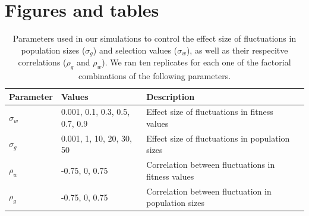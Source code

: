 \documentclass[12pt]{article}
\begin{document}
\section*{Figures and tables }


\begin{table}[h]
\fontsize{10}{18}\selectfont
\centering
\caption{Parameters used in our simulations to control the effect size of fluctuations in population sizes ($\sigma_{g}$) and selection values ($\sigma_{w}$), as well as their respecitve correlations ($\rho_{g}$ and $\rho_{w}$). We ran ten replicates for each one  of the factorial combinations of the following parameters. }
\begin{tabular}{@{}llll@{}}
\toprule
Parameter                    & Values                    & Description                                   &  \\ \midrule
$\sigma_{w}$ & 0.001, 0.1, 0.3, 0.5, 0.7, 0.9 & Effect size of fluctuations in fitness values &  \\
$\sigma_{g}$ & 0.001, 1, 10, 20, 30, 50 & Effect size of fluctuations in population sizes                                              &  \\
$\rho_{w}$  &  -0.75, 0, 0.75                         &   Correlation between fluctuations in fitness values                                            &  \\
$\rho_{g}$  &   -0.75, 0, 0.75                        &  Correlation between fluctuation in population sizes                                             &  \\ \bottomrule
\end{tabular}
\label{tab:fluctuations}
\end{table}
\end{document}
